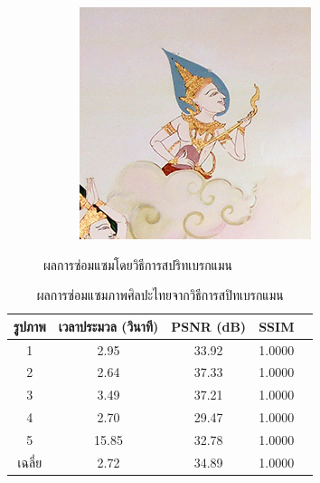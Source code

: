 \begin{figure}[H]
\begin{subfigure}{0.4\linewidth}
			\includegraphics[width=0.8\linewidth]{image/result_ex4/splitbergman_case05.png}			
		\end{subfigure}
		\caption{ผลการซ่อมแซมโดยวิธีการสปริทเบรกแมน}
	\end{figure}
	\begin{table}[H]
		\centering
		\begin{tabular}[ht]{|c|c|c|c|c|}
			\hline
			รูปภาพ &เวลาประมวล  (วินาที) & PSNR (dB) & SSIM \\
			\hline
			1 & 2.95 & 33.92 & 1.0000 \\ 
			2 & 2.64 & 37.33 & 1.0000 \\
			3 &  3.49 & 37.21 & 1.0000 \\
			4 & 2.70  & 29.47  & 1.0000 \\
			5 & 15.85  & 32.78  & 1.0000 \\
			\hline
			เฉลี่ย & 2.72  & 34.89  & 1.0000 \\
			\hline
		\end{tabular}
		\caption{ผลการซ่อมแซมภาพศิลปะไทยจากวิธีการสปิทเบรกแมน}
		\label{result:table-thaiart-splitbregman}
	\end{table}
